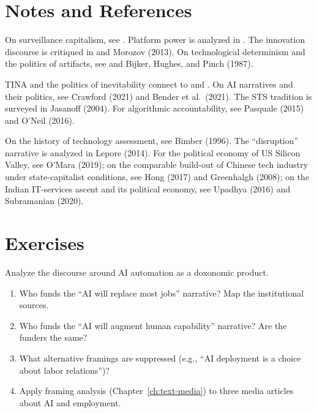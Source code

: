 \section{Notes and References}
\label{sec:ch28-notes}

On surveillance capitalism, see \textcite{zuboff2019}.
Platform power is analyzed in \textcite{sunstein2017}.
The innovation discourse is critiqued in \textcite{mirowski2009} and Morozov (2013).
On technological determinism and the politics of artifacts, see \textcite{winner1986} and Bijker, Hughes, and Pinch (1987).

TINA and the politics of inevitability connect to \textcite{brown2015} and \textcite{streeck2016}.
On AI narratives and their politics, see Crawford (2021) and Bender et al.\ (2021).
The STS tradition is surveyed in Jasanoff (2004).
For algorithmic accountability, see Pasquale (2015) and O'Neil (2016).

On the history of technology assessment, see Bimber (1996).
The ``disruption'' narrative is analyzed in Lepore (2014).
For the political economy of US Silicon Valley, see O'Mara (2019); on the comparable build-out of Chinese tech industry under state-capitalist conditions, see Hong (2017) and Greenhalgh (2008); on the Indian IT-services ascent and its political economy, see Upadhya (2016) and Subramanian (2020).

\section{Exercises}

\begin{exercise}
Analyze the discourse around AI automation as a doxonomic product.
\begin{enumerate}[nosep]
  \item Who funds the ``AI will replace most jobs'' narrative? Map the institutional sources.
  \item Who funds the ``AI will augment human capability'' narrative? Are the funders the same?
  \item What alternative framings are suppressed (e.g., ``AI deployment is a choice about labor relations'')?
  \item Apply framing analysis (Chapter~\ref{ch:text-media}) to three media articles about AI and employment.
\end{enumerate}
\end{exercise}

